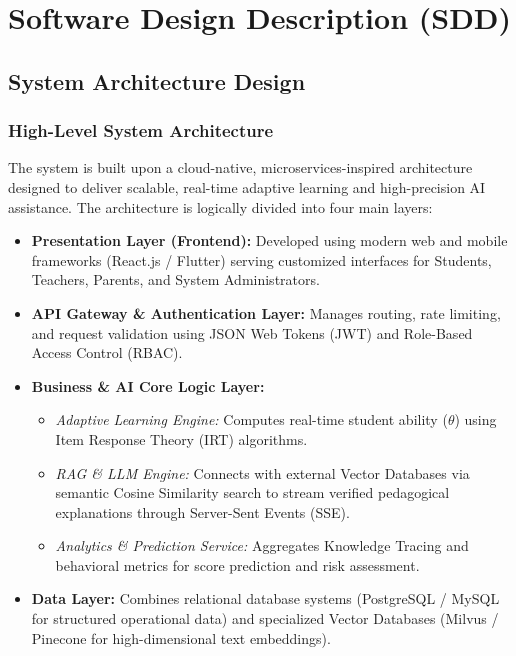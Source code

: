 \documentclass[12pt,a4paper]{article}
\begin{document}
\section{Software Design Description (SDD)}

\subsection{System Architecture Design}

\subsubsection{High-Level System Architecture}
The system is built upon a cloud-native, microservices-inspired architecture designed to deliver scalable, real-time adaptive learning and high-precision AI assistance. The architecture is logically divided into four main layers:
\begin{itemize}[leftmargin=1.5em, itemsep=0.2em]
    \item \textbf{Presentation Layer (Frontend):} Developed using modern web and mobile frameworks (React.js / Flutter) serving customized interfaces for Students, Teachers, Parents, and System Administrators.
    \item \textbf{API Gateway \& Authentication Layer:} Manages routing, rate limiting, and request validation using JSON Web Tokens (JWT) and Role-Based Access Control (RBAC).
    \item \textbf{Business \& AI Core Logic Layer:}
    \begin{itemize}[leftmargin=1.5em, itemsep=0.1em]
        \item \textit{Adaptive Learning Engine:} Computes real-time student ability ($\theta$) using Item Response Theory (IRT) algorithms.
        \item \textit{RAG \& LLM Engine:} Connects with external Vector Databases via semantic Cosine Similarity search to stream verified pedagogical explanations through Server-Sent Events (SSE).
        \item \textit{Analytics \& Prediction Service:} Aggregates Knowledge Tracing and behavioral metrics for score prediction and risk assessment.
    \end{itemize}
    \item \textbf{Data Layer:} Combines relational database systems (PostgreSQL / MySQL for structured operational data) and specialized Vector Databases (Milvus / Pinecone for high-dimensional text embeddings).
\end{itemize}
\end{document}
